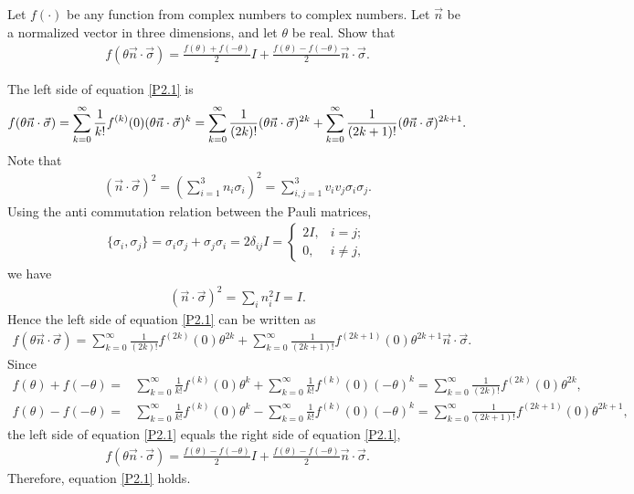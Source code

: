 \documentclass[en]{sol-man}
\begin{document}
\begin{prob}
    Let $f(\cdot)$ be any function from complex numbers to complex numbers. Let $\vec{n}$ be a normalized vector in three dimensions, and let $\theta$ be real. Show that
    \begin{align}
        \label{P2.1}
        f(\theta\vec{n}\cdot\vec{\sigma})=\frac{f(\theta)+f(-\theta)}{2}I+\frac{f(\theta)-f(-\theta)}{2}\vec{n}\cdot\vec{\sigma}.
    \end{align}
\end{prob}
\begin{pf}
    The left side of equation \eqref{P2.1} is
    \begin{align}
        \notag f(\theta\vec{n}\cdot\vec{\sigma})=\sum_{k=0}^{\infty}\frac{1}{k!}f^{(k)}(0)(\theta\vec{n}\cdot\vec{\sigma})^k=\sum_{k=0}^{\infty}\frac{1}{(2k)!}(\theta\vec{n}\cdot\vec{\sigma})^{2k}+\sum_{k=0}^{\infty}\frac{1}{(2k+1)!}(\theta\vec{n}\cdot\vec{\sigma})^{2k+1}.
    \end{align}
    Note that
    \begin{align}
        (\vec{n}\cdot\vec{\sigma})^2=\left(\sum_{i=1}^3n_i\sigma_i\right)^2=\sum_{i,j=1}^3v_iv_j\sigma_i\sigma_j.
    \end{align}
    Using the anti commutation relation between the Pauli matrices,
    \begin{align}
        \{\sigma_i,\sigma_j\}=\sigma_i\sigma_j+\sigma_j\sigma_i=2\delta_{ij}I=\left\{\begin{array}{ll}
            2I,&i=j;\\
            0,&i\neq j,
        \end{array}\right.
    \end{align}
    we have
    \begin{align}
        (\vec{n}\cdot\vec{\sigma})^2=\sum_in_i^2I=I.
    \end{align}
    Hence the left side of equation \eqref{P2.1} can be written as
    \begin{align}
        f(\theta\vec{n}\cdot\vec{\sigma})=\sum_{k=0}^{\infty}\frac{1}{(2k)!}f^{(2k)}(0)\theta^{2k}+\sum_{k=0}^{\infty}\frac{1}{(2k+1)!}f^{(2k+1)}(0)\theta^{2k+1}\vec{n}\cdot\vec{\sigma}.
    \end{align}
    Since
    \begin{align}
        f(\theta)+f(-\theta)=&\sum_{k=0}^{\infty}\frac{1}{k!}f^{(k)}(0)\theta^k+\sum_{k=0}^{\infty}\frac{1}{k!}f^{(k)}(0)(-\theta)^k=\sum_{k=0}^{\infty}\frac{1}{(2k)!}f^{(2k)}(0)\theta^{2k},\\
        f(\theta)-f(-\theta)=&\sum_{k=0}^{\infty}\frac{1}{k!}f^{(k)}(0)\theta^k-\sum_{k=0}^{\infty}\frac{1}{k!}f^{(k)}(0)(-\theta)^k=\sum_{k=0}^{\infty}\frac{1}{(2k+1)!}f^{(2k+1)}(0)\theta^{2k+1},
    \end{align}
    the left side of equation \eqref{P2.1} equals the right side of equation \eqref{P2.1},
    \begin{align}
        f(\theta\vec{n}\cdot\vec{\sigma})=\frac{f(\theta)-f(-\theta)}{2}I+\frac{f(\theta)-f(-\theta)}{2}\vec{n}\cdot\vec{\sigma}.
    \end{align}
    Therefore, equation \eqref{P2.1} holds.
\end{pf}

\ifx\allfiles\undefined


\end{document}
